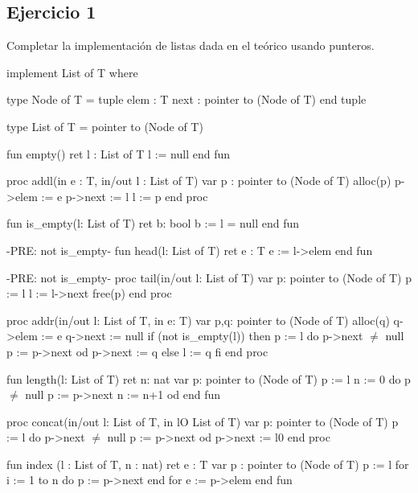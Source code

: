 \subsection{Ejercicio 1}
Completar la implementación de listas dada en el teórico usando punteros.

\begin{codebox}
\begin{pascallike}
implement List of T where

type Node of T = tuple
                    elem : T
                    next : pointer to (Node of T)
                 end tuple

type List of T = pointer to (Node of T)

fun empty() ret l : List of T
    l := null
end fun

proc addl(in e : T, in/out l : List of T)
    var p : pointer to (Node of T)
    alloc(p)
    p->elem := e
    p->next := l
    l := p
end proc

fun is_empty(l: List of T) ret b: bool
    b := l = null
end fun

{-PRE: not is_empty-}
fun head(l: List of T) ret e : T
    e := l->elem
end fun
\end{pascallike}
\end{codebox}

\begin{codebox}
\begin{pascallike}
{-PRE: not is_empty-}
proc tail(in/out l: List of T)
    var p: pointer to (Node of T)
    p := l
    l := l->next
    free(p)
end proc

proc addr(in/out l: List of T, in e: T)
    var p,q: pointer to (Node of T)
    alloc(q)
    q->elem := e
    q->next := null 
    if (not is_empty(l)) then
        p := l
        do p->next $\neq$ null 
            p := p->next
        od
        p->next := q
    else
        l := q
    fi
end proc

fun length(l: List of T) ret n: nat
    var p: pointer to (Node of T)
    p := l
    n := 0
    do p $\neq$ null 
        p := p->next
        n := n+1
    od
end fun

proc concat(in/out l: List of T, in lO List of T)
    var p: pointer to (Node of T)
    p := l
    do p->next $\neq$ null
        p := p->next
    od
    p->next := l0
end proc

fun index (l : List of T, n : nat) ret e : T
    var p : pointer to (Node of T)
    p := l
    for i := 1 to n do
        p := p->next
    end for
    e := p->elem
end fun
\end{pascallike}
\end{codebox}

